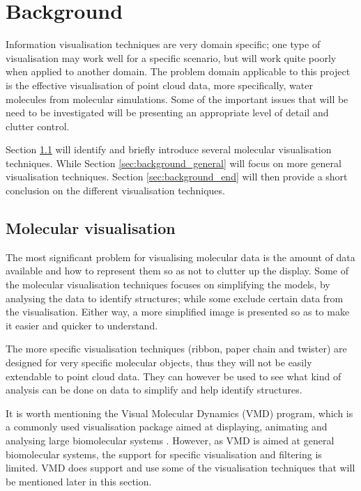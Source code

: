 \graphicspath{{./background/}}

\chapter{Background}
\label{cha:background}


Information visualisation techniques are very domain specific; one type of
visualisation may work well for a specific scenario, but will work quite poorly
when applied to another domain. The problem domain applicable to this project
is the effective visualisation of point cloud data, more specifically, water
molecules from molecular simulations. Some of the important issues that will be
need to be investigated will be presenting an appropriate level of detail and
clutter control.

Section \ref{sec:background_molecular} will identify and briefly introduce
several molecular visualisation techniques. While Section
\ref{sec:background_general} will focus on more general visualisation
techniques. Section \ref{sec:background_end} will then provide a short
conclusion on the different visualisation techniques.



\section{Molecular visualisation}
\label{sec:background_molecular}


The most significant problem for visualising molecular data is the amount of
data available and how to represent them so as not to clutter up the display.
Some of the molecular visualisation techniques focuses on simplifying the
models, by analysing the data to identify structures; while some exclude
certain data from the visualisation. Either way, a more simplified image is
presented so as to make it easier and quicker to understand.

The more specific visualisation techniques (ribbon, paper chain and twister) are
designed for very specific molecular objects, thus they will not be easily
extendable to point cloud data. They can however be used to see what kind of
analysis can be done on data to simplify and help identify structures.

It is worth mentioning the Visual Molecular Dynamics (VMD) \citep{humphrey96}
program, which is a commonly used visualisation package aimed at displaying,
animating and analysing large biomolecular systems \citep{VMD}. However, as VMD
is aimed at general biomolecular systems, the support for specific
visualisation and filtering is limited. VMD does support and use some of the
visualisation techniques that will be mentioned later in this section.

